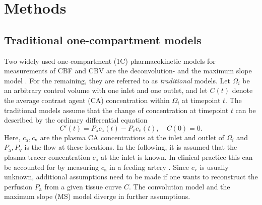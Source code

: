 \documentclass[final,5p,times,twocolumn]{elsarticle}
\begin{document}
	

	

	\section{Methods} 


	\subsection{Traditional one-compartment models}\label{sec:traditional}
	Two widely used one-compartment (1C) pharmacokinetic models for measurements of CBF and CBV  are the deconvolution- and the maximum slope model \cite{Feng2013,Chen2011,kudo10}.
	For the remaining, they are referred to as \emph{traditional} models.	Let $\Omega_i$ be an arbitrary control volume with one inlet and one outlet, and let $C(t)$ denote the average contrast agent (CA) concentration within $\Omega_i$ at timepoint $t$.
	The traditional models assume that the change of concentration at timepoint $t$ can be described by the ordinary differential equation 
	\begin{equation}\label{eq:classicgeneral}
		C'(t) = P_{\mathrm{a}}c_\mathrm{a}(t) - P_{\mathrm{v}}c_{\mathrm{v}}(t), \quad C(0) = 0.
	\end{equation}
	Here, $c_\mathrm{a},c_{\mathrm{v}}$ are the plasma CA concentrations at the inlet and outlet of $\Omega_i$ and $P_{\mathrm{a}},P_{\mathrm{v}}$ is the flow at these locations.
	In the following, it is assumed that the plasma tracer concentration $c_\mathrm{a}$ at the inlet is known.
	In clinical practice this can be accounted for by measuring $c_\mathrm{a}$ in a feeding artery \cite{ostergaard96}.
	Since $c_{\mathrm{v}}$ is usually unknown, additional assumptions need to be made if one wants to reconstruct the perfusion $P_{\mathrm{a}}$ from a given tissue curve $C$. The convolution model and the maximum slope (MS) model diverge in further assumptions.
\end{document}
